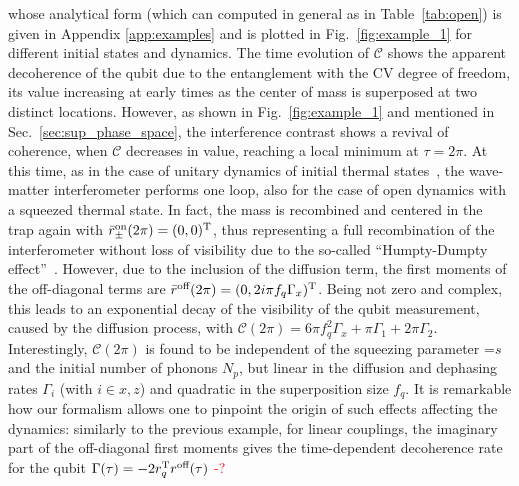\documentclass[%
reprint,
superscriptaddress,
nofootinbib,
 amsmath,amssymb,
prx,
floatfix,
]{revtex4-2}
\begin{document}
whose analytical form (which can computed in general as in Table~\ref{tab:open}) is given in Appendix \ref{app:examples} and is plotted in Fig.~\ref{fig:example_1} for different initial states and dynamics. The time evolution of $\mathcal{C}$ shows the apparent decoherence of the qubit due to the entanglement with the CV degree of freedom, its value increasing at early times as the center of mass is superposed at two distinct locations. However, as shown in Fig.~\ref{fig:example_1} and mentioned in Sec.~\ref{sec:sup_phase_space}, the interference contrast shows a revival of coherence, when $\mathcal{C}$ decreases in value, reaching a local minimum at $\tau = 2 \pi$. At this time, as in the case of unitary dynamics of initial thermal states~\cite{scala_matter_2013}, the wave-matter interferometer performs one loop, also for the case of open dynamics with a squeezed thermal state. In fact,  the mass is recombined and centered in the trap again with $\bar{r}^{\text{on}}_{\pm} (2 \pi) = (0,0)^{\rm T}$, thus representing a full recombination of the interferometer without loss of visibility due to the so-called ``Humpty-Dumpty effect''~\cite{englert_is_1988, japha_quantum_2023, xiang2024phononinducedcontrastmatter, zhou2024gyroscopicstabilitynanoparticlessterngerlach}. However, due to the inclusion of the diffusion term, the first moments of the off-diagonal terms are $\bar{r}^{\text{off}} (2 \pi) = (0,2 i \pi f_q \Gamma_x)^{\rm T}$. Being not zero and complex, this leads to an exponential decay of the visibility of the qubit measurement, caused by the diffusion process, with $\mathcal{C}(2 \pi) = 6 \pi  f_q^2 \Gamma_x + \pi \Gamma_1 + 2 \pi \Gamma_2 $.  Interestingly, $\mathcal{C}(2 \pi)$ is found to be independent of the squeezing parameter =$s$ and the initial number of phonons $N_p$, but linear in the diffusion and dephasing rates $\Gamma_i$ (with $i\in x,z$) and quadratic in the superposition size $f_q$.  It is remarkable how our formalism allows one to pinpoint the origin of such effects affecting the dynamics: similarly to the previous example, for linear couplings, the imaginary part of the off-diagonal first moments gives the time-dependent decoherence rate for the qubit $\Gamma (\tau) = -2 r_q^{\rm T} r^{\text{off}} (\tau)$ \textcolor{red}{-?}
\end{document}
